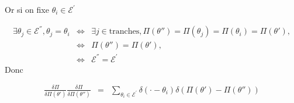 	Or si on fixe $  \theta_i \in \mathscr{E}^{'} $
	
	\begin{eqnarray}
		 \exists \theta_j \in \mathscr{E}^{''} , \theta_j = \theta_i & \Leftrightarrow & \exists j \in \mbox{tranches} , \Pi(\theta'') = \Pi(\theta_j ) =  \Pi(\theta_i  ) = \Pi(\theta' ),\\
		 & \Leftrightarrow & \Pi(\theta'') =
		\Pi(\theta' ),\\
		& \Leftrightarrow & \mathscr{E}^{''} = \mathscr{E}^{'}
	\end{eqnarray}
	Donc 
	
	\begin{eqnarray}
		\frac{\delta \Pi }{\delta \Pi(\theta') } \frac{\delta \Pi }{\delta \Pi(\theta'') } & = & \sum_{\theta_i \in  \mathscr{E}^{'}}   \delta ( \cdot  - \theta_i )	\delta (  \Pi(\theta')  - \Pi(\theta'') )
	\end{eqnarray}
	
	
	
